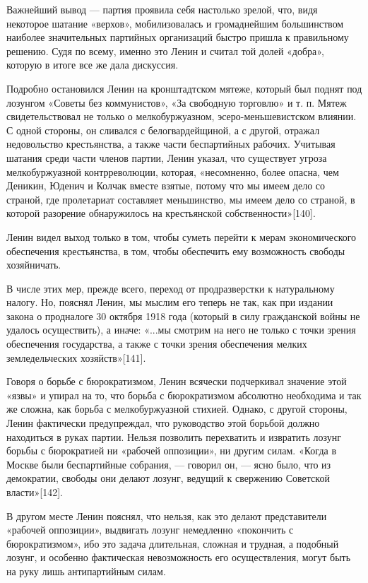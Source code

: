 \documentclass[12pt, a4paper, openany]{book}
\begin{document}
Важнейший вывод — партия проявила себя настолько зрелой, что, видя некоторое шатание «верхов», мобилизовалась и громаднейшим большинством наиболее значительных партийных организаций быстро пришла к правильному решению. Судя по всему, именно это Ленин и считал той долей «добра», которую в итоге все же дала дискуссия.

Подробно остановился Ленин на кронштадтском мятеже, который был поднят под лозунгом «Советы без коммунистов», «За свободную торговлю» и т. п. Мятеж свидетельствовал не только о мелкобуржуазном, эсеро-меньшевистском влиянии. С одной стороны, он сливался с белогвардейщиной, а с другой, отражал недовольство крестьянства, а также части беспартийных рабочих. Учитывая шатания среди части членов партии, Ленин указал, что существует угроза мелкобуржуазной контрреволюции, которая, «несомненно, более опасна, чем Деникин, Юденич и Колчак вместе взятые, потому что мы имеем дело со страной, где пролетариат составляет меньшинство, мы имеем дело со страной, в которой разорение обнаружилось на крестьянской собственности»[140].

Ленин видел выход только в том, чтобы суметь перейти к мерам экономического обеспечения крестьянства, в том, чтобы обеспечить ему возможность свободы хозяйничать.

В числе этих мер, прежде всего, переход от продразверстки к натуральному налогу. Но, пояснял Ленин, мы мыслим его теперь не так, как при издании закона о продналоге 30 октября 1918 года (который в силу гражданской войны не удалось осуществить), а иначе: «...мы смотрим на него не только с точки зрения обеспечения государства, а также с точки зрения обеспечения мелких земледельческих хозяйств»[141].

Говоря о борьбе с бюрократизмом, Ленин всячески подчеркивал значение этой «язвы» и упирал на то, что борьба с бюрократизмом абсолютно необходима и так же сложна, как борьба с мелкобуржуазной стихией. Однако, с другой стороны, Ленин фактически предупреждал, что руководство этой борьбой должно находиться в руках партии. Нельзя позволить перехватить и извратить лозунг борьбы с бюрократией ни «рабочей оппозиции», ни другим силам. «Когда в Москве были беспартийные собрания, — говорил он, — ясно было, что из демократии, свободы они делают лозунг, ведущий к свержению Советской власти»[142].

В другом месте Ленин пояснял, что нельзя, как это делают представители «рабочей оппозиции», выдвигать лозунг немедленно «покончить с бюрократизмом», ибо это задача длительная, сложная и трудная, а подобный лозунг, и особенно фактическая невозможность его осуществления, могут быть на руку лишь антипартийным силам.
\end{document}
